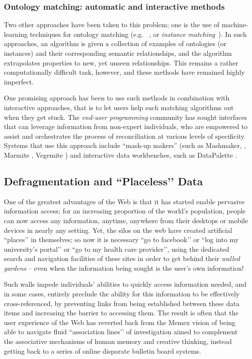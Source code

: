 \documentclass[graybox]{svmult}
\begin{document}
\subsubsection{Ontology matching: automatic and interactive methods}
Two other approaches have been taken to this problem; one is the use of machine-learning techniques for ontology matching (e.g. ~\cite{euzenat2004api,doan2003learning}, or \emph{instance matching}~\cite{suchanek2011paris,castano2006matching}).  In such approaches, an algorithm is given a collection of examples of ontologies (or instances) and their corresponding semantic relationships, and the algorithm extrapolates properties to new, yet unseen relationships.  This remains a rather computationally difficult task, however, and these methods have remained highly imperfect.

One promising approach has been to use such methods in combination with interactive approaches, that is to let users help such matching algorithms out when they get stuck.  The \emph{end-user programming} community has sought interfaces that can leverage information from non-expert individuals, who are empowered to assist and orchestrates the process of reconciliation at various levels of specificity.  Systems that use this approach include ``mash-up makers'' (such as Mashmaker, \cite{intel_mashmaker}, Marmite \cite{Lin:2009:EPM:1502650.1502667}, Vegemite \cite{Wong:2007:MMM:1240624.1240842}) and interactive data workbenches, such as DataPalette \cite{van2013carpe}.

\subsection{Defragmentation and ``Placeless’’ Data}
One of the greatest advantages of the Web is that it has started enable pervasive information access; for an increasing proportion of the world’s population, people can now access any information, anytime, anywhere from their desktops or mobile devices in nearly any setting\cite{perry2001dealing}. Yet, the silos on the web have created artificial ``places’’  in themselves; so now it is necessary ``go to facebook’’ or ``log into my university’s portal’’ or ``go to my health care provider’’, using the dedicated search and navigation facilities of these sites in order to get behind their \emph{walled gardens} -- even when the information being sought is the user’s own information!

Such walls impede individuals’ abilities to quickly access information needed, and in some cases, entirely preclude the ability for this information to be effectively cross-referenced, by preventing links from being established between these data items and increasing the barrier to accessing them.  The result is often that the user experience of the Web has reverted back from the Memex vision of being able to navigate fluid ``association lines’’ of investigation aimed to complement the associative mechanisms of human memory and creative thinking, instead getting back to a series of online disparate bulletin board systems.
\end{document}
